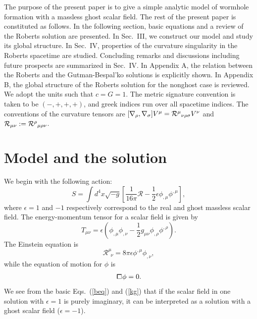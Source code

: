 \documentclass[aps,prd,twocolumn,eqsecnum,showpacs,amsmath]{revtex4}
\newcommand{\ma}[1]{\mbox{$\mathcal{#1}$}}
\newcommand{\dalm}{\kern1pt\vbox{\hrule height 0.9pt\hbox{\vrule width
0.9pt\hskip 2.5pt\vbox{\vskip 5.5pt}\hskip 3pt\vrule width 0.3pt}\hrule height
0.3pt}\kern1pt}
\begin{document}
The purpose of the present paper is to give a simple analytic model of wormhole formation with a massless ghost scalar field.
The rest of the present paper is constituted as follows.
In the following section, basic equations and a review of the Roberts solution are presented. 
In Sec.~III, we construct our model and study its global structure.
In Sec.~IV, properties of the curvature singularity in the Roberts spacetime are studied.
Concluding remarks and discussions including future prospects are summarized in Sec.~IV.
In Appendix A, the relation between the Roberts and the Gutman-Bespal'ko solutions is explicitly shown.
In Appendix B, the global structure of the Roberts solution for the nonghost case is reviewed.
We adopt the units such that $c=G=1$.
The metric signature convention is taken to be $(-,+,+,+)$, and greek indices run over all spacetime indices.
The conventions of the curvature tensors are 
$[\nabla _\rho ,\nabla_\sigma]V^\mu ={{\cal R}^\mu }_{\nu\rho\sigma}V^\nu$ 
and ${\cal R}_{\mu \nu }:={{\cal R}^\rho }_{\mu \rho \nu }$.










\section{Model and the solution}
We begin with the following action: 
\begin{equation}
S=\int d^4x\sqrt{-g}\left[\frac{1}{16\pi}{\ma R}-\frac12 \epsilon \phi_{,\mu}\phi^{,\mu}\right],
\label{action}
\end{equation}
where $\epsilon=1$ and $-1$ respectively correspond to the real and ghost massless scalar field.
The energy-momentum tensor for a scalar field is given by 
\begin{equation}
T_{\mu\nu}=\epsilon \left(\phi_{,\mu}\phi_{,\nu}-\frac{1}{2}g_{\mu\nu}\phi_{,\rho}\phi^{,\rho}\right).
\label{eq:stress-energy_tensor_of_scalar_field}
\end{equation}
The Einstein equation is 
\begin{equation}
{\ma R}^{\mu}_{~~\nu}=8\pi \epsilon \phi^{,\mu}\phi_{,\nu}, \label{beq}
\end{equation}
while the equation of motion for $\phi$ is 
\begin{eqnarray}
\dalm\phi=0.\label{kg}
\end{eqnarray}
We see from the basic Eqs.~(\ref{beq}) and (\ref{kg}) that if the scalar field in one solution with $\epsilon=1$ is purely imaginary, it can be interpreted as a solution with a ghost scalar field ($\epsilon=-1$).
\end{document}
